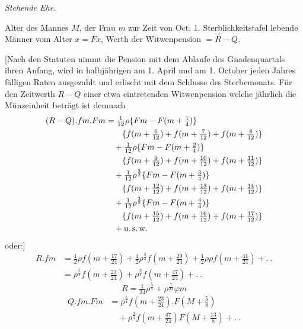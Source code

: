 \begin{center}\textit{Stehende Ehe.}\end{center}
\noindent\hspace*{1.2em} Alter des Mannes \(M\), der Frau \(m\) zur Zeit von Oct. 1. Sterblichkeitstafel lebende Männer vom Alter \(x=Fx\), Werth der Witwenpension \(=R-Q\).

[Nach den Statuten nimmt die Pension mit dem Ablaufe des Gnadenquartals ihren Anfang, wird in halbjährigen am 1. April und am 1. October jeden Jahres fälligen Raten ausgezahlt und erlischt mit dem Schlusse des Sterbemonats. Für den Zeitwerth \(R-Q\) einer etwa eintretenden Witwenpension welche jährlich die Münzeinheit beträgt ist demnach
\[
\begin{aligned}
(R-Q)\mathord{.}fm\mathord{.}Fm&=\tfrac{1}{12}\rho\{Fm-F(m+\tfrac{1}{4})\}\\
&\qquad\{f(m+\tfrac{6}{12})+f(m+\tfrac{7}{12})+f(m+\tfrac{8}{12})\}\\
&\quad+\tfrac{1}{12}\rho\{Fm-F(m+\tfrac{2}{4})\}\\
&\qquad\{f(m+\tfrac{9}{12})+f(m+\tfrac{10}{12})+f(m+\tfrac{11}{12})\}\\
&\quad+\tfrac{1}{12}\rho^{\frac{3}{2}}\{Fm-F(m+\tfrac{3}{4})\}\\
&\qquad\{f(m+\tfrac{12}{12})+f(m+\tfrac{13}{12})+f(m+\tfrac{14}{12})\}\\
&\quad+\tfrac{1}{12}\rho^{\frac{3}{2}}\{Fm-F(m+\tfrac{4}{4})\}\\
&\qquad\{f(m+\tfrac{15}{12})+f(m+\tfrac{16}{12})+f(m+\tfrac{17}{12})\}\\
&\quad+\text{u.\,s.\,w.}
\end{aligned}
\]
\noindent oder:]
\[
\begin{aligned}
R\mathord{.}fm&=\tfrac{1}{2}\rho f(m+\tfrac{17}{24})+\tfrac{1}{2}\rho^{\frac{3}{2}}f(m+\tfrac{29}{24})+\tfrac{1}{2}\rho\rho f(m+\tfrac{41}{24})+.\ .\\
&=\rho^{\frac{5}{4}}f(m+\tfrac{23}{24})+\rho^{\frac{9}{4}}f(m+\tfrac{47}{24})+.\ .
\end{aligned}
\]
\[
R=\tfrac{1}{24}\rho^{\frac{5}{4}}+\rho^{\frac{7}{24}}\varphi m
\]
\[
\begin{aligned}
Q\mathord{.}fm\mathord{.}Fm&=\rho^{\frac{5}{4}}f(m+\tfrac{23}{24})\mathord{.}F(M+\tfrac{5}{8})\\
&\quad+\rho^{\frac{9}{4}}f(m+\tfrac{47}{24})F(M+\tfrac{13}{8})+.\ .
\end{aligned}
\]

